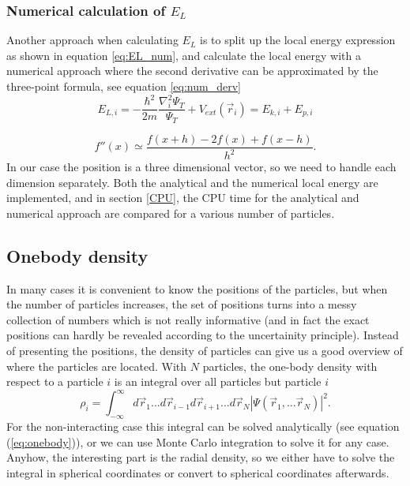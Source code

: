 \documentclass[norsk,a4paper,12pt]{article}
\begin{document}
\subsubsection{Numerical calculation of $E_L$} \label{Numerical_calc_E_L}

Another approach when calculating $E_L$ is to split up the local energy expression as shown in equation \ref{eq:EL_num}, and calculate the local energy with a numerical approach where the second derivative can be approximated by the three-point formula, see equation \ref{eq:num_derv}
\begin{equation}
\label{eq:EL_num}
E_{L,i}=-\frac{\hbar^2}{2m}\frac{\nabla_i^2\Psi_T}{\Psi_T}+V_{ext}(\vec{r}_i)=E_{k,i}+E_{p,i}
\end{equation}

\begin{equation}
\label{eq:num_derv}
f''(x)\simeq\frac{f(x+h)-2f(x)+f(x-h)}{h^2}.
\end{equation}
In our case the position is a three dimensional vector, so we need to handle each dimension separately. Both the analytical and the numerical local energy are implemented, and in section \ref{CPU}, the CPU time for the analytical and numerical approach are compared for a various number of particles. 


\subsection{Onebody density} \label{sec:OB_theory}
In many cases it is convenient to know the positions of the particles, but when the number of particles increases, the set of positions turns into a messy collection of numbers which is not really informative (and in fact the exact positions can hardly be revealed according to the uncertainity principle). Instead of presenting the positions, the density of particles can give us a good overview of where the particles are located. With $N$ particles, the one-body density with respect to a particle $i$ is an integral over all particles but particle $i$
\begin{equation}
\rho_i=\int_{-\infty}^{\infty}d\vec{r}_1\hdots d\vec{r}_{i-1}d\vec{r}_{i+1}\hdots d\vec{r}_N |\Psi(\vec{r}_1,\hdots \vec{r}_N)|^2.
\end{equation}
For the non-interacting case this integral can be solved analytically (see equation (\ref{eq:onebody})), or we can use Monte Carlo integration to solve it for any case. Anyhow, the interesting part is the radial density, so we either have to solve the integral in spherical coordinates or convert to spherical coordinates afterwards. 
\end{document}
